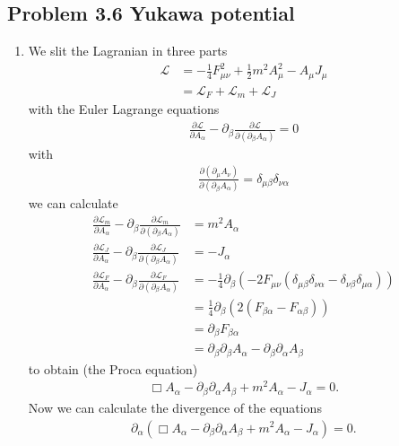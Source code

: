 \documentclass[10pt,a4paper]{book}
\theoremstyle{definition}
\begin{document}
\subsection{Problem 3.6 Yukawa potential}
\begin{enumerate}[label=(\alph*)]
\item We slit the Lagranian in three parts
\begin{align}
\mathscr{L}&=-\frac{1}{4}F_{\mu\nu}^2+\frac{1}{2}m^2A_\mu^2-A_\mu J_\mu\\
&=\mathscr{L}_F+\mathscr{L}_m+\mathscr{L}_J
\end{align}
with the Euler Lagrange equations
\begin{align}
        \frac{\partial\mathscr{L}}{\partial A_\alpha}-\partial_\beta\frac{\partial\mathscr{L}}{\partial(\partial_\beta A_\alpha)}=0
\end{align}
with
\begin{align}
    \frac{\partial(\partial_\mu A_\nu)}{\partial(\partial_\beta A_\alpha)}=\delta_{\mu\beta}\delta_{\nu\alpha}
\end{align}
we can calculate
\begin{align}
    \frac{\partial\mathscr{L}_m}{\partial A_\alpha}-\partial_\beta\frac{\partial\mathscr{L}_m}{\partial(\partial_\beta A_\alpha)}&=m^2A_\alpha\\
    \frac{\partial\mathscr{L}_J}{\partial A_\alpha}-\partial_\beta\frac{\partial\mathscr{L}_J}{\partial(\partial_\beta A_\alpha)}&=-J_\alpha\\
    \frac{\partial\mathscr{L}_F}{\partial A_\alpha}-\partial_\beta\frac{\partial\mathscr{L}_F}{\partial(\partial_\beta A_\alpha)}&=-\frac{1}{4}\partial_\beta\left(-2F_{\mu\nu}(\delta_{\mu\beta}\delta_{\nu\alpha}-\delta_{\nu\beta}\delta_{\mu\alpha})\right)\\
    &=\frac{1}{4}\partial_\beta\left(2(F_{\beta\alpha}-F_{\alpha\beta})\right)\\
    &=\partial_\beta F_{\beta\alpha}\\
    &=\partial_\beta\partial_\beta A_\alpha-\partial_\beta\partial_\alpha A_\beta
\end{align}
to obtain (the Proca equation)
\begin{align}
    \Box A_\alpha-\partial_\beta\partial_\alpha A_\beta+m^2A_\alpha-J_\alpha=0.
\end{align}
Now we can calculate the divergence of the equations
\begin{align}
    \partial_\alpha\left(\Box A_\alpha-\partial_\beta\partial_\alpha A_\beta+m^2A_\alpha-J_\alpha\right)=0.\\

\end{align}
\end{enumerate}
\end{document}
